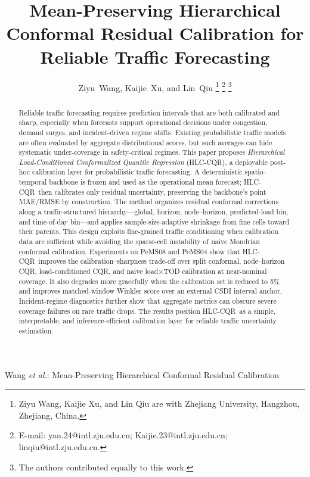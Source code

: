 \documentclass[letterpaper,journal]{IEEEtran}
\newcommand{\hlc}{HLC-CQR}
\begin{document}
\title{Mean-Preserving Hierarchical Conformal Residual Calibration for Reliable Traffic Forecasting}

\author{Ziyu~Wang, Kaijie~Xu, and Lin~Qiu%
\thanks{Ziyu Wang, Kaijie Xu, and Lin Qiu are with Zhejiang University, Hangzhou, Zhejiang, China.}%
\thanks{E-mail: yan.24@intl.zju.edu.cn; Kaijie.23@intl.zju.edu.cn; linqiu@intl.zju.edu.cn.}%
\thanks{The authors contributed equally to this work.}}

%
{Wang \MakeLowercase{\textit{et al.}}: Mean-Preserving Hierarchical Conformal Residual Calibration}

\maketitle

\begin{abstract}
Reliable traffic forecasting requires prediction intervals that are both calibrated and sharp, especially when forecasts support operational decisions under congestion, demand surges, and incident-driven regime shifts. Existing probabilistic traffic models are often evaluated by aggregate distributional scores, but such averages can hide systematic under-coverage in safety-critical regimes. This paper proposes \emph{Hierarchical Load-Conditioned Conformalized Quantile Regression} (\hlc), a deployable post-hoc calibration layer for probabilistic traffic forecasting. A deterministic spatio-temporal backbone is frozen and used as the operational mean forecast; \hlc\ then calibrates only residual uncertainty, preserving the backbone's point MAE/RMSE by construction. The method organizes residual conformal corrections along a traffic-structured hierarchy---global, horizon, node--horizon, predicted-load bin, and time-of-day bin---and applies sample-size-adaptive shrinkage from fine cells toward their parents. This design exploits fine-grained traffic conditioning when calibration data are sufficient while avoiding the sparse-cell instability of naive Mondrian conformal calibration. Experiments on PeMS08 and PeMS04 show that \hlc\ improves the calibration--sharpness trade-off over split conformal, node--horizon CQR, load-conditioned CQR, and naive load$\times$TOD calibration at near-nominal coverage. It also degrades more gracefully when the calibration set is reduced to 5\% and improves matched-window Winkler score over an external CSDI interval anchor. Incident-regime diagnostics further show that aggregate metrics can obscure severe coverage failures on rare traffic drops. The results position \hlc\ as a simple, interpretable, and inference-efficient calibration layer for reliable traffic uncertainty estimation.
\end{abstract}
\end{document}
